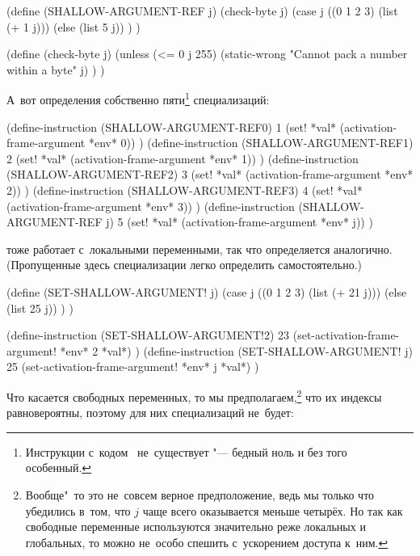 \begin{code:lisp}
(define (SHALLOW-ARGUMENT-REF j)
  (check-byte j)
  (case j
    ((0 1 2 3) (list (+ 1 j)))
    (else      (list 5 j)) ) )

(define (check-byte j)
  (unless (<= 0 j 255)
    (static-wrong "Cannot pack a number within a byte" j) ) )
\end{code:lisp}

А~вот определения собственно пяти\footnote{Инструкции с~кодом~
не~существует "--- бедный ноль и без того особенный.} специализаций:

\begin{code:lisp}
(define-instruction (SHALLOW-ARGUMENT-REF0) 1
  (set! *val* (activation-frame-argument *env* 0)) )
(define-instruction (SHALLOW-ARGUMENT-REF1) 2
  (set! *val* (activation-frame-argument *env* 1)) )
(define-instruction (SHALLOW-ARGUMENT-REF2) 3
  (set! *val* (activation-frame-argument *env* 2)) )
(define-instruction (SHALLOW-ARGUMENT-REF3) 4
  (set! *val* (activation-frame-argument *env* 3)) )
(define-instruction (SHALLOW-ARGUMENT-REF j) 5
  (set! *val* (activation-frame-argument *env* j)) )
\end{code:lisp}

 тоже работает с~локальными переменными, так что
определяется аналогично. (Пропущенные здесь специализации легко определить
самостоятельно.)

\begin{code:lisp}
(define (SET-SHALLOW-ARGUMENT! j)
  (case j
    ((0 1 2 3) (list (+ 21 j)))
    (else      (list 25 j)) ) )

(define-instruction (SET-SHALLOW-ARGUMENT!2) 23
  (set-activation-frame-argument! *env* 2 *val*) )
(define-instruction (SET-SHALLOW-ARGUMENT! j) 25
  (set-activation-frame-argument! *env* j *val*) )
\end{code:lisp}

Что касается свободных переменных, то мы предполагаем,\footnote*{Вообще"~то это
не~совсем верное предположение, ведь мы только что убедились в~том, что $j$ чаще
всего оказывается меньше четырёх. Но так как свободные переменные используются
значительно реже локальных и глобальных, то можно не~особо спешить с~ускорением
доступа к~ним.} что их индексы равновероятны, поэтому для них специализаций
не~будет:

